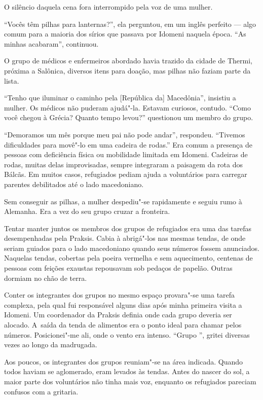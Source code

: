 O silêncio daquela cena fora interrompido pela voz de uma mulher.

``Vocês têm pilhas para lanternas?'', ela perguntou, em um inglês
perfeito --- algo comum para a maioria dos sírios que passava por
Idomeni naquela época. ``As minhas acabaram'', continuou.

O grupo de médicos e enfermeiros abordado havia trazido da cidade de
Thermi, próxima a Salônica, diversos itens para doação, mas pilhas não faziam parte da lista.

``Tenho que iluminar o caminho pela {[}República da{]} Macedônia'',
insistiu a mulher. Os médicos não puderam ajudá"-la. Estavam curiosos,
contudo. ``Como você chegou à Grécia? Quanto tempo levou?'' questionou
um membro do grupo.

``Demoramos um mês porque meu pai não pode andar'', respondeu.
``Tivemos dificuldades para movê"-lo em uma cadeira de rodas.''
 Era comum a presença de pessoas com deficiência física ou mobilidade limitada em Idomeni.
 Cadeiras de rodas, muitas delas improvisadas, sempre integraram a paisagem da rota dos Bálcãs. Em muitos
casos, refugiados pediam ajuda a voluntários para carregar parentes
debilitados até o lado macedoniano.

Sem conseguir as pilhas, a mulher despediu"-se rapidamente e seguiu rumo
à Alemanha. Era a vez do seu grupo cruzar a fronteira.


Tentar manter juntos os membros dos grupos de refugiados era uma das
tarefas desempenhadas pela Praksis. Cabia à  abrigá"-los nas mesmas
tendas, de onde seriam guiados para o lado macedoniano quando seus
números fossem anunciados. Naquelas tendas, cobertas pela poeira
vermelha e sem aquecimento, centenas de pessoas com feições exaustas
repousavam sob pedaços de papelão. Outras dormiam no chão de terra.

Conter os integrantes dos grupos no mesmo espaço provara"-se uma tarefa
complexa, pela qual fui responsável alguns dias após minha primeira
visita a Idomeni. Um coordenador da Praksis definia onde cada grupo
deveria ser alocado. A~saída da tenda de alimentos era o ponto ideal
para chamar pelos números. Posicionei"-me ali, onde o vento era intenso. ``Grupo '', gritei diversas vezes
ao longo da madrugada.

Aos poucos, os integrantes dos grupos reuniam"-se na área indicada.
Quando todos haviam se aglomerado, eram levados às tendas. Antes do
nascer do sol, a maior parte dos voluntários não tinha mais voz,
enquanto os refugiados pareciam confusos com a gritaria.

